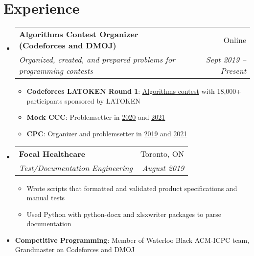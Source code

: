 \documentclass[letterpaper,11pt]{article}
\makeatletter
\newcommand{\resumeItem}[2]{
  \item\small{
    \textbf{#1}{: #2 \vspace{-2pt}}
  }
}
\newcommand{\resumeText}[1]{
  \item\small{
    \textbf{}{#1 \vspace{-2pt}}
  }
}
\newcommand{\resumeSubheading}[4]{
  \vspace{-1pt}\item
    \begin{tabular*}{0.97\textwidth}[t]{l@{\extracolsep{\fill}}r}
      \textbf{#1} & #2 \\
      \textit{\small#3} & \textit{\small #4} \\
    \end{tabular*}\vspace{-5pt}
}
\newcommand{\resumeSubHeadingListStart}{\begin{itemize}[leftmargin=*]}
\newcommand{\resumeSubHeadingListEnd}{\end{itemize}}
\newcommand{\resumeItemListStart}{\begin{itemize}}
\newcommand{\resumeItemListEnd}{\end{itemize}\vspace{-5pt}}
\newcommand{\link}[2]{\href{#1}{\color{linkblue}\underline{#2}}}
\newcommand{\linkblack}[2]{\href{#1}{\underline{#2}}}
\makeatother
\begin{document}
\section{Experience}
  \resumeSubHeadingListStart
    \resumeSubheading
      {Algorithms Contest Organizer (Codeforces and DMOJ)}{Online}
      {Organized, created, and prepared problems for programming contests}{Sept 2019 -- Present}
      \resumeItemListStart
        \resumeItem{Codeforces LATOKEN Round 1}{\linkblack{https://codeforces.com/contest/1534}{Algorithms contest} with 18,000+ participants sponsored by LATOKEN}
        \resumeItem{Mock CCC}
          {Problemsetter in \linkblack{https://dmoj.ca/contest/mccc1}{2020} and \linkblack{https://dmoj.ca/contest/rccc1}{2021}}
        \resumeItem{CPC}
          {Organizer and problemsetter in \linkblack{https://dmoj.ca/contest/cpc19}{2019} and \linkblack{https://dmoj.ca/contest/cpc21c1}{2021}}
      \resumeItemListEnd
    
    
    \resumeSubheading
      {Focal Healthcare}{Toronto, ON}
      {Test/Documentation Engineering}{August 2019}
      \resumeItemListStart
        \resumeText{Wrote scripts that formatted and validated product specifications and manual tests}
        \resumeText{Used Python with python-docx and xlsxwriter packages to parse documentation}
      \resumeItemListEnd
    \resumeItem{Competitive Programming}{Member of Waterloo Black ACM-ICPC team, Grandmaster on Codeforces and DMOJ}

  \resumeSubHeadingListEnd

\end{document}

